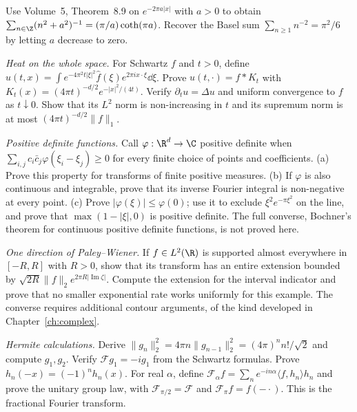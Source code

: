 \begin{exercise}[$\star$]\label{ex:cothsum}
Use Volume~5, Theorem~8.9 on $e^{-2\pi a|x|}$ with $a>0$ to obtain $\sum_{n\in\Z}(n^2+a^2)^{-1}=(\pi/a)\coth(\pi a)$. Recover the Basel sum $\sum_{n\ge1}n^{-2}=\pi^2/6$ by letting $a$ decrease to zero.
\end{exercise}
\begin{exercise}[$\star$]\label{ex:heatft}
\emph{Heat on the whole space.} For Schwartz $f$ and $t>0$, define
$u(t,x)=\int e^{-4\pi^2t|\xi|^2}\hat f(\xi)e^{2\pi ix\cdot\xi}\dd\xi$.
Prove $u(t,\cdot)=f*K_t$ with $K_t(x)=(4\pi t)^{-d/2}e^{-|x|^2/(4t)}$. Verify $\partial_tu=\Delta u$ and uniform convergence to $f$ as $t\downarrow0$. Show that its $L^2$ norm is non-increasing in $t$ and its supremum norm is at most $(4\pi t)^{-d/2}\|f\|_1$.
\end{exercise}
\begin{exercise}[$\star\star$]\label{ex:bochner}
\emph{Positive definite functions.} Call $\varphi:\R^d\to\C$ positive definite when $\sum_{i,j}c_i\bar c_j\varphi(\xi_i-\xi_j)\ge0$ for every finite choice of points and coefficients. (a) Prove this property for transforms of finite positive measures. (b) If $\varphi$ is also continuous and integrable, prove that its inverse Fourier integral is non-negative at every point. (c) Prove $|\varphi(\xi)|\le\varphi(0)$; use it to exclude $\xi^2e^{-\pi\xi^2}$ on the line, and prove that $\max(1-|\xi|,0)$ is positive definite. The full converse, Bochner's theorem for continuous positive definite functions, is not proved here.
\end{exercise}
\begin{exercise}[$\star\star$]\label{ex:paleywiener}
\emph{One direction of Paley--Wiener.} If $f\in L^2(\R)$ is supported almost everywhere in $[-R,R]$ with $R>0$, show that its transform has an entire extension bounded by $\sqrt{2R}\|f\|_2e^{2\pi R|\operatorname{Im}\zeta|}$. Compute the extension for the interval indicator and prove that no smaller exponential rate works uniformly for this example. The converse requires additional contour arguments, of the kind developed in Chapter~\ref{ch:complex}.
\end{exercise}
\begin{exercise}[$\star$]\label{ex:hermitecalc}
\emph{Hermite calculations.} Derive $\|g_n\|_2^2=4\pi n\|g_{n-1}\|_2^2=(4\pi)^nn!/\sqrt2$ and compute $g_1,g_2$. Verify $\mathcal Fg_1=-ig_1$ from the Schwartz formulas. Prove $h_n(-x)=(-1)^nh_n(x)$. For real $\alpha$, define $\mathcal F_\alpha f=\sum_ne^{-in\alpha}\langle f,h_n\rangle h_n$ and prove the unitary group law, with $\mathcal F_{\pi/2}=\mathcal F$ and $\mathcal F_\pi f=f(-\cdot)$. This is the fractional Fourier transform.
\end{exercise}
